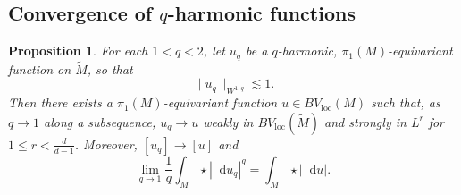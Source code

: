 \documentclass[reqno,11pt]{amsart}
\newcommand*\dif{\mathop{}\!\mathrm{d}}
\newcommand{\loc}{\mathrm{loc}}
\newtheorem{proposition}[theorem]{Proposition}
\theoremstyle{definition}
\numberwithin{equation}{section}
\begin{document}
\subsection{Convergence of \texorpdfstring{$q$-harmonic functions}{q-harmonic functions}}
\begin{proposition}\label{qharmonics converge}
For each $1 < q < 2$, let $u_q$ be a $q$-harmonic, $\pi_1(M)$-equivariant function on $\tilde M$, so that
$$\|u_q\|_{W^{1, q}} \lesssim 1.$$
Then there exists a $\pi_1(M)$-equivariant function $u \in BV_\loc(M)$ such that, as $q \to 1$ along a subsequence, $u_q \to u$ weakly in $BV_\loc(\tilde M)$ and strongly in $L^r$ for $1 \leq r < \frac{d}{d - 1}$.
Moreover, $[u_q] \to [u]$ and
\begin{equation}\label{convergence of Lq norms to TV}
\lim_{q \to 1} \frac{1}{q} \int_M \star |\dif u_q|^q = \int_M \star |\dif u|.
\end{equation}
\end{proposition}
\end{document}
